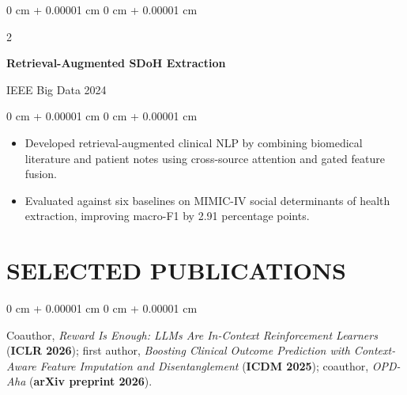 \documentclass[10pt, letterpaper]{article}
\newenvironment{highlights}{
    \begin{itemize}[
        topsep=0.03 cm,
        parsep=0.03 cm,
        partopsep=0pt,
        itemsep=0pt,
        leftmargin=0 cm + 10pt
    ]
}{
    \end{itemize}
} %
\newenvironment{onecolentry}{
    \begin{adjustwidth}{
        0 cm + 0.00001 cm
    }{
        0 cm + 0.00001 cm
    }
}{
    \end{adjustwidth}
} %
\newenvironment{twocolentry}[2][]{
    \onecolentry
    \def\secondColumn{#2}
    \setcolumnwidth{\fill, 4.5 cm}
    \begin{paracol}{2}
}{
    \switchcolumn \raggedleft \secondColumn
    \end{paracol}
    \endonecolentry
} %
\begin{document}
\begin{twocolentry}{IEEE Big Data 2024}
\textbf{Retrieval-Augmented SDoH Extraction}
\end{twocolentry}
\begin{onecolentry}
\begin{highlights}
\item Developed retrieval-augmented clinical NLP by combining biomedical literature and patient notes using cross-source attention and gated feature fusion.
\item Evaluated against six baselines on MIMIC-IV social determinants of health extraction, improving macro-F1 by 2.91 percentage points.
\end{highlights}
\end{onecolentry}
\vspace{0.035 cm}
\section{SELECTED PUBLICATIONS}
\begin{onecolentry}
Coauthor, \textit{Reward Is Enough: LLMs Are In-Context Reinforcement Learners} (\textbf{ICLR 2026}); first author, \textit{Boosting Clinical Outcome Prediction with Context-Aware Feature Imputation and Disentanglement} (\textbf{ICDM 2025}); coauthor, \textit{OPD-Aha} (\textbf{arXiv preprint 2026}).
\end{onecolentry}
\end{document}
